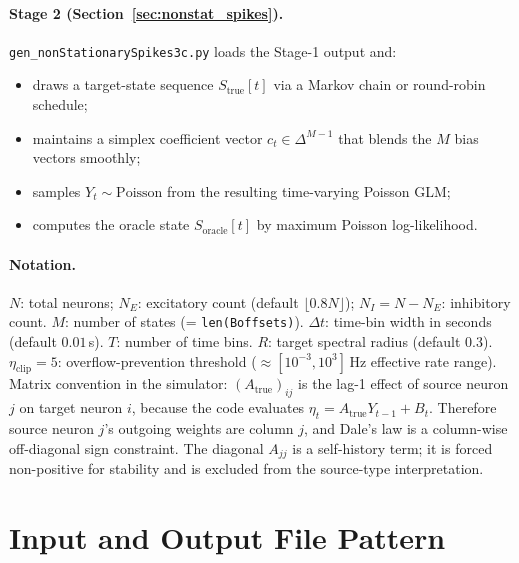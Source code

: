 \documentclass[11pt]{article}
\begin{document}
\paragraph{Stage 2 (Section~\ref{sec:nonstat_spikes}).}
\texttt{gen\_nonStationarySpikes3c.py} loads the Stage-1 output and:
\begin{itemize}
  \item draws a target-state sequence $S_{\text{true}}[t]$
        via a Markov chain or round-robin schedule;
  \item maintains a simplex coefficient vector $c_t \in \Delta^{M-1}$
        that blends the $M$ bias vectors smoothly;
  \item samples $Y_t \sim \mathrm{Poisson}$ from the resulting
        time-varying Poisson GLM;
  \item computes the oracle state $S_{\text{oracle}}[t]$ by
        maximum Poisson log-likelihood.
\end{itemize}

\paragraph{Notation.}
$N$: total neurons; $N_E$: excitatory count (default $\lfloor 0.8N \rfloor$);
$N_I = N - N_E$: inhibitory count.
$M$: number of states (= \texttt{len(Boffsets)}).
$\Delta t$: time-bin width in seconds (default $0.01$\,s).
$T$: number of time bins.
$R$: target spectral radius (default $0.3$).
$\eta_{\mathrm{clip}} = 5$: overflow-prevention threshold
($\approx [10^{-3}, 10^3]$\,Hz effective rate range).
Matrix convention in the simulator:
$(A_{\text{true}})_{ij}$ is the lag-1 effect of source neuron \(j\)
on target neuron \(i\), because the code evaluates
\(\eta_t=A_{\text{true}}Y_{t-1}+B_t\). Therefore source neuron \(j\)'s
outgoing weights are column \(j\), and Dale's law is a column-wise
off-diagonal sign constraint. The diagonal \(A_{jj}\) is a self-history term;
it is forced non-positive for stability and is excluded from the source-type
interpretation.

\section{Input and Output File Pattern}
\label{sec:io}
\end{document}

